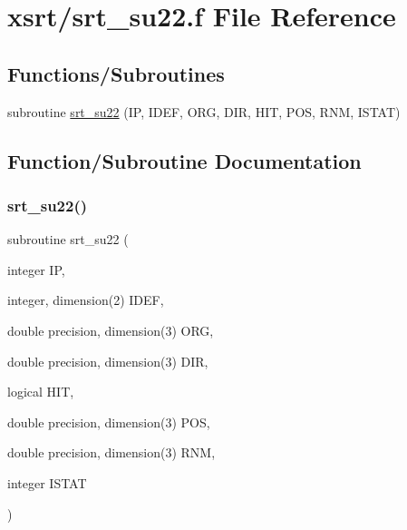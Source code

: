 \hypertarget{srt__su22_8f}{}\section{xsrt/srt\+\_\+su22.f File Reference}
\label{srt__su22_8f}
\subsection*{Functions/\+Subroutines}
\begin{DoxyCompactItemize}
\item 
subroutine \hyperlink{srt__su22_8f_af011f38795fd42bf411c2edcfbb0f377}{srt\+\_\+su22} (IP, I\+D\+EF, O\+RG, D\+IR, H\+IT, P\+OS, R\+NM, I\+S\+T\+AT)
\end{DoxyCompactItemize}


\subsection{Function/\+Subroutine Documentation}
\mbox{\label{srt__su22_8f_af011f38795fd42bf411c2edcfbb0f377}} 
\subsubsection{\texorpdfstring{srt\+\_\+su22()}{srt\_su22()}}
{\footnotesize\ttfamily subroutine srt\+\_\+su22 (\begin{DoxyParamCaption}\item[{integer}]{IP,  }\item[{integer, dimension(2)}]{I\+D\+EF,  }\item[{double precision, dimension(3)}]{O\+RG,  }\item[{double precision, dimension(3)}]{D\+IR,  }\item[{logical}]{H\+IT,  }\item[{double precision, dimension(3)}]{P\+OS,  }\item[{double precision, dimension(3)}]{R\+NM,  }\item[{integer}]{I\+S\+T\+AT }\end{DoxyParamCaption})}

